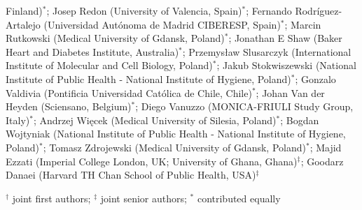 \documentclass[12pt]{article}
\begin{document}
\begin{refsection}
Finland)$^{*}$; Josep Redon (University of Valencia, Spain)$^{*}$; Fernando Rodríguez-Artalejo (Universidad Autónoma de Madrid CIBERESP, Spain)$^{*}$; Marcin Rutkowski (Medical University of Gdansk, Poland)$^{*}$; Jonathan E Shaw (Baker Heart and Diabetes Institute, Australia)$^{*}$; Przemysław Slusarczyk (International Institute of Molecular and Cell Biology, Poland)$^{*}$; Jakub Stokwiszewski (National Institute of Public Health - National Institute of Hygiene, Poland)$^{*}$; Gonzalo Valdivia (Pontificia Universidad Católica de Chile, Chile)$^{*}$; Johan Van der Heyden (Sciensano, Belgium)$^{*}$; Diego Vanuzzo (MONICA-FRIULI Study Group, Italy)$^{*}$; Andrzej Więcek (Medical University of Silesia, Poland)$^{*}$; Bogdan Wojtyniak (National Institute of Public Health - National Institute of Hygiene, Poland)$^{*}$; Tomasz Zdrojewski (Medical University of Gdansk, Poland)$^{*}$; Majid Ezzati (Imperial College London, UK; University of Ghana, Ghana)$^{\ddagger}$; Goodarz Danaei (Harvard TH Chan School of Public Health, USA)$^{\ddagger}$

$^{\dagger}$ joint first authors; $^{\ddagger}$ joint senior authors; $^{*}$ contributed equally


\clearpage
\end{refsection}
\printbibliography[section=1,resetnumbers=true]


\end{document}
